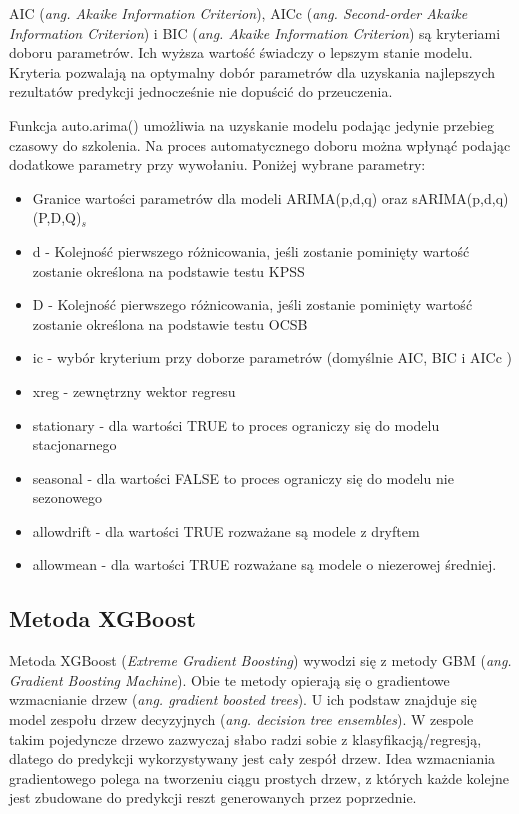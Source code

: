 \documentclass[11pt]{report}
\begin{document}
AIC (\textit{ang. Akaike Information Criterion}), AICc (\textit{ang. Second-order Akaike Information Criterion}) i BIC (\textit{ang. Akaike Information Criterion}) są kryteriami doboru parametrów. Ich wyższa wartość świadczy o lepszym stanie modelu. Kryteria pozwalają na optymalny dobór parametrów dla uzyskania najlepszych rezultatów predykcji jednocześnie nie dopuścić do przeuczenia.

Funkcja auto.arima() umożliwia na uzyskanie modelu podając jedynie przebieg czasowy do szkolenia. 
Na proces automatycznego doboru można wpłynąć podając dodatkowe parametry przy wywołaniu. Poniżej wybrane parametry:
\begin{itemize}
\item Granice wartości parametrów dla modeli ARIMA(p,d,q) oraz sARIMA(p,d,q)(P,D,Q)$_s$
\item d - Kolejność pierwszego różnicowania, jeśli zostanie pominięty wartość zostanie określona na podstawie testu KPSS
\item D - Kolejność pierwszego różnicowania, jeśli zostanie pominięty wartość zostanie określona na podstawie testu OCSB
\item ic - wybór kryterium przy doborze parametrów (domyślnie AIC, BIC i AICc )
\item xreg - zewnętrzny wektor regresu
\item stationary - dla wartości TRUE to proces ograniczy się do modelu stacjonarnego
\item seasonal - dla wartości FALSE to proces ograniczy się do modelu nie sezonowego
\item allowdrift - dla wartości TRUE rozważane są modele z dryftem
\item allowmean - dla wartości TRUE rozważane są modele o niezerowej średniej.
\end{itemize}

\subsection{Metoda XGBoost}
Metoda XGBoost (\textit{Extreme Gradient Boosting}) wywodzi się z metody GBM (\textit{ang. Gradient Boosting Machine}).
Obie te metody opierają się o gradientowe wzmacnianie drzew (\textit{ang. gradient boosted trees}).
U ich podstaw znajduje się model zespołu drzew decyzyjnych (\textit{ang. decision tree ensembles}).
W zespole takim pojedyncze drzewo zazwyczaj słabo radzi sobie z klasyfikacją/regresją, dlatego do predykcji wykorzystywany jest cały zespół drzew.
Idea wzmacniania gradientowego polega na tworzeniu ciągu prostych drzew, z których każde kolejne jest zbudowane do predykcji reszt generowanych przez poprzednie.
\end{document}
